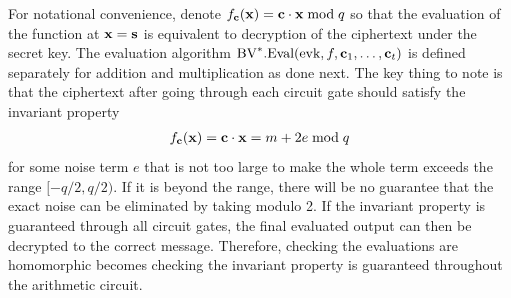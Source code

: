 \documentclass[../main.tex]{subfiles}
\begin{document}
For notational convenience, denote $f_{\mathbf{c}}(\mathbf{x}) = \mathbf{c} \cdot \mathbf{x} \bmod q$ so that the evaluation of the function at $\mathbf{x}=\mathbf{s}$ is equivalent to decryption of the ciphertext under the secret key. The evaluation algorithm $\text{BV}^*.\text{Eval}(\text{evk}, f, \mathbf{c}_1, \dots, \mathbf{c}_t)$ is defined separately for addition and multiplication as done next. 
The key thing to note is that the ciphertext after going through each circuit gate should satisfy the invariant property
\begin{align}
\label{eq:shEvalInvariant}
    f_{\mathbf{c}}(\mathbf{x}) = \mathbf{c} \cdot \mathbf{x} = m + 2e \bmod q
\end{align}
for some noise term $e$ that is not too large to make the whole term exceeds the range $[-q/2, q/2)$. If it is beyond the range, there will be no guarantee that the exact noise can be eliminated by taking modulo 2. If the invariant property is guaranteed through all circuit gates, the final evaluated output can then be decrypted to the correct message. Therefore, checking the evaluations are homomorphic becomes checking the invariant property is guaranteed throughout the arithmetic circuit. %

\end{document}
